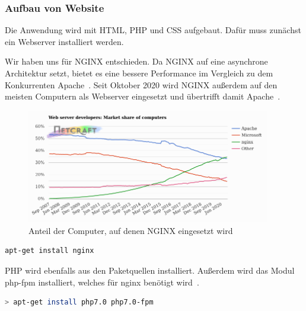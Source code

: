 \subsubsection{Aufbau von Website}
Die Anwendung wird mit HTML, PHP und CSS aufgebaut.
Dafür muss zunächst ein Webserver installiert werden.


Wir haben uns für NGINX entschieden.
Da NGINX auf eine asynchrone Architektur setzt, bietet es eine bessere Performance im Vergleich zu dem Konkurrenten Apache~\cite{NginxVsApache}.
Seit Oktober 2020 wird NGINX außerdem auf den meisten Computern als Webserver eingesetzt und übertrifft damit Apache~\cite{WebServerSurvey}.

\begin{figure}[H]\centering
    \includegraphics[width=0.95\textwidth]{img/NGINX.png}
    \caption{Anteil der Computer, auf denen NGINX eingesetzt wird~\cite{WebServerSurvey}}\label{fig:figure}
\end{figure}

\begin{lstlisting}[language=Bash, caption=Installation von NGINX,label={lst:nginxinstall}]
apt-get install nginx
\end{lstlisting}



PHP wird ebenfalls aus den Paketquellen installiert.
Außerdem wird das Modul php-fpm installiert, welches für nginx benötigt wird~\cite{InstallNginxPHP}.

\begin{lstlisting}[language=Bash, caption=PHP und PHP-FPM installation,label={lst:installphpphpfpm}]
> apt-get install php7.0 php7.0-fpm
\end{lstlisting}



